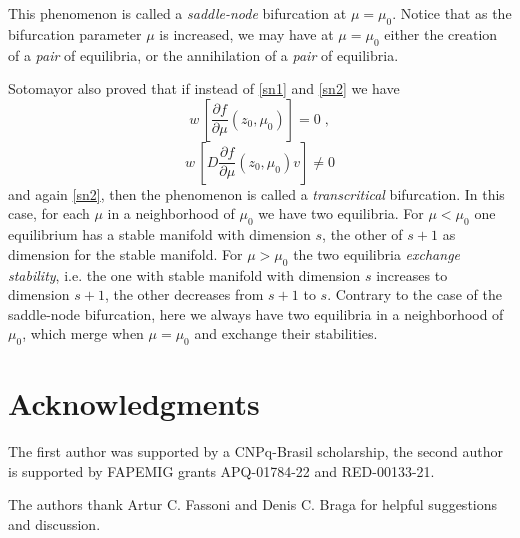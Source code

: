 \documentclass[12pt]{article}
\theoremstyle{definition}
\begin{document}
This phenomenon is called a \emph{saddle-node} bifurcation at $\mu=\mu_0$. Notice that as the bifurcation parameter $\mu$ is increased, we may have at $\mu=\mu_0$ either the creation of a \emph{pair} of equilibria, or the annihilation of a \emph{pair} of equilibria.

Sotomayor \cite{sotomayor} also proved that if instead of \eqref{sn1} and \eqref{sn2} we have
\begin{equation} \label{tc1}
	w \, [\frac{\partial f}{\partial \mu}(z_0,\mu_0)] = 0\;,
\end{equation}
\begin{equation} \label{tc2}
	w \, [D \frac{\partial f}{\partial \mu}(z_0, \mu_0) v] \neq 0
\end{equation}
and again \eqref{sn2}, then the phenomenon is called a \emph{transcritical} bifurcation. In this case, for each $\mu$ in a neighborhood of $\mu_0$ we have two equilibria. For $\mu<\mu_0$ one equilibrium has a stable manifold with dimension $s$, the other of $s+1$ as dimension for the stable manifold. For $\mu>\mu_0$ the two equilibria \emph{exchange stability}, i.e. the one with stable manifold with dimension $s$ increases to dimension $s+1$, the other decreases from $s+1$ to $s$. Contrary to the case of the saddle-node bifurcation, here we always have two equilibria in a neighborhood of $\mu_0$, which merge when $\mu=\mu_0$ and exchange their stabilities.


\section*{Acknowledgments}
The first author was supported by a CNPq-Brasil scholarship, the second author is supported by FAPEMIG grants APQ-01784-22 and RED-00133-21.

The authors thank Artur C. Fassoni and Denis C. Braga for helpful suggestions and discussion.
\end{document}

